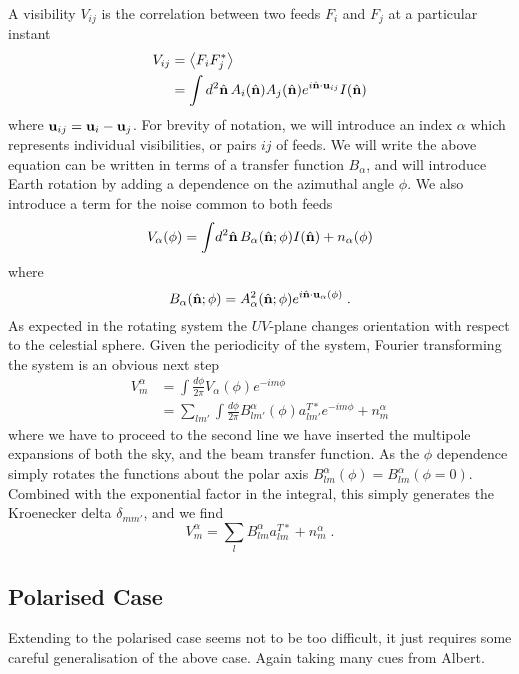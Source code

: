\documentclass{revtex4}
\begin{document}
A visibility $V_{ij}$ is the correlation between two feeds $F_i$ and $F_j$ at a
particular instant
\begin{align}
  V_{ij} & = \left\langle F_i F_j^* \right\rangle \\
  &= \int d^2\hat{\mathbf{n}} \, A_i(\hat{\mathbf{n}}) A_j(\hat{\mathbf{n}}) e^{i \hat{\mathbf{n}} \cdot \mathbf{u}_{ij}}
  I(\hat{\mathbf{n}})
\end{align}
where $\mathbf{u}_{ij} = \mathbf{u}_i - \mathbf{u}_j$. For brevity of notation, we will introduce an
index $\alpha$ which represents individual visibilities, or pairs $ij$ of
feeds. We will write the above equation can be written in terms of a transfer
function $B_\alpha$, and will introduce Earth rotation by adding a dependence on
the azimuthal angle $\phi$. We also introduce a term for the noise common to
both feeds
\begin{equation}
  V_\alpha(\phi) = \int \! d^2\hat{\mathbf{n}}\, B_\alpha(\hat{\mathbf{n}}; \phi) I(\hat{\mathbf{n}})
  + n_\alpha(\phi)
\end{equation}
where
\begin{equation}
  B_\alpha(\hat{\mathbf{n}}; \phi) = A_\alpha^2(\hat{\mathbf{n}}; \phi) e^{i \hat{\mathbf{n}} \cdot
    \mathbf{u}_{\alpha}(\phi)} \; .
\end{equation}
As expected in the rotating system the $UV$-plane changes orientation with
respect to the celestial sphere. Given the periodicity of the system, Fourier
transforming the system is an obvious next step
\begin{align}
  V^\alpha_m &= \int \frac{d\phi}{2\pi} V_\alpha(\phi) e^{-i m \phi} \\
  & = \sum_{l m'}\int \frac{d\phi}{2\pi} B^\alpha_{l m'}(\phi) a^{T*}_{l m'}
  e^{-i m \phi}+ n^\alpha_m
\end{align}
where we have to proceed to the second line we have inserted the multipole
expansions of both the sky, and the beam transfer function. As the $\phi$
dependence simply rotates the functions about the polar axis
$B^\alpha_{lm}(\phi) = B^{\alpha}_{lm}(\phi=0)$. Combined with the exponential
factor in the integral, this simply generates the Kroenecker delta
$\delta_{mm'}$, and we find
\begin{equation}
V^\alpha_m = \sum_{l} B^\alpha_{l m} a^{T*}_{l m}+ n^\alpha_m \; .
\end{equation}

\subsection{Polarised Case}

Extending to the polarised case seems not to be too difficult, it just requires
some careful generalisation of the above case. Again taking many cues from
Albert.
\end{document}
